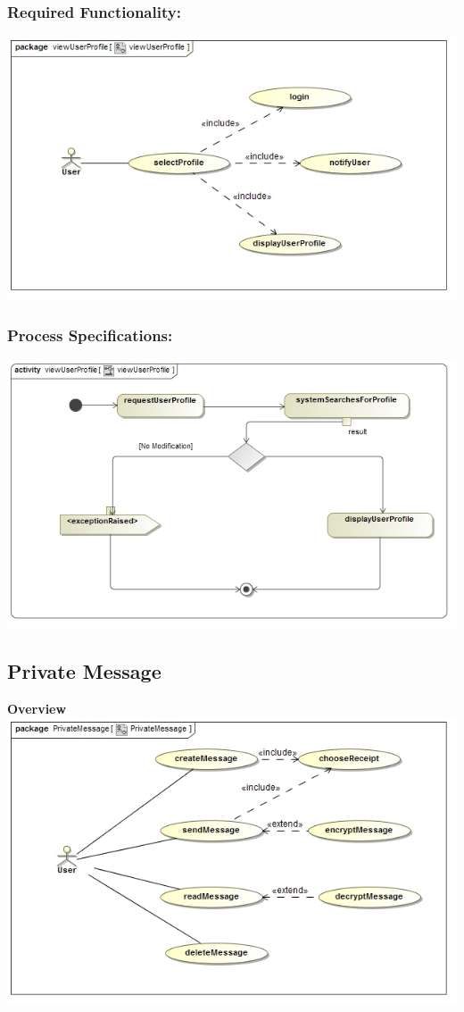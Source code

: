 \documentclass[a4paper,11pt]{article}
\begin{document}
\subsubsection{Required Functionality:} 
\includegraphics[width=1\linewidth]{./Images/UserProfile/ViewUserProfileUseCase}
\subsubsection{Process Specifications:} 
\includegraphics[width=1\linewidth]{./Images/UserProfile/ViewUserProfileActivity}

\subsection{Private Message}
\textbf{Overview}\\
\includegraphics[width=1\linewidth]{./Images/OverviewDiagrams/PrivateMessage.jpg}\\
\end{document}

